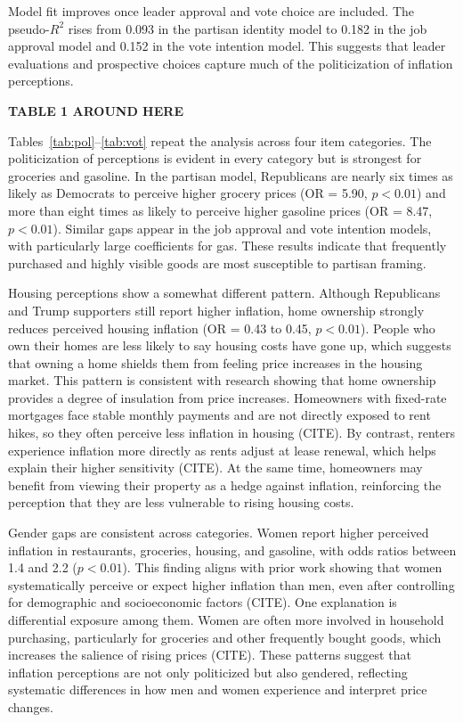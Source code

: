 \documentclass[preprint,12pt,authoryear]{elsarticle}
\begin{document}
Model fit improves once leader approval and vote choice are included. The pseudo-$R^2$ rises from 0.093 in the partisan identity model to 0.182 in the job approval model and 0.152 in the vote intention model. This suggests that leader evaluations and prospective choices capture much of the politicization of inflation perceptions.  



\begin{center}
\textbf{TABLE 1 AROUND HERE}
\end{center}

Tables~\ref{tab:pol}--\ref{tab:vot} repeat the analysis across four item categories. The politicization of perceptions is evident in every category but is strongest for groceries and gasoline. In the partisan model, Republicans are nearly six times as likely as Democrats to perceive higher grocery prices (OR = 5.90, $p<0.01$) and more than eight times as likely to perceive higher gasoline prices (OR = 8.47, $p<0.01$). Similar gaps appear in the job approval and vote intention models, with particularly large coefficients for gas. These results indicate that frequently purchased and highly visible goods are most susceptible to partisan framing.  

Housing perceptions show a somewhat different pattern. Although Republicans and Trump supporters still report higher inflation, home ownership strongly reduces perceived housing inflation (OR = 0.43 to 0.45, $p<0.01$). People who own their homes are less likely to say housing costs have gone up, which suggests that owning a home shields them from feeling price increases in the housing market. This pattern is consistent with research showing that home ownership provides a degree of insulation from price increases. Homeowners with fixed-rate mortgages face stable monthly payments and are not directly exposed to rent hikes, so they often perceive less inflation in housing (CITE). By contrast, renters experience inflation more directly as rents adjust at lease renewal, which helps explain their higher sensitivity (CITE). At the same time, homeowners may benefit from viewing their property as a hedge against inflation, reinforcing the perception that they are less vulnerable to rising housing costs.

Gender gaps are consistent across categories. Women report higher perceived inflation in restaurants, groceries, housing, and gasoline, with odds ratios between 1.4 and 2.2 ($p<0.01$). This finding aligns with prior work showing that women systematically perceive or expect higher inflation than men, even after controlling for demographic and socioeconomic factors (CITE). One explanation is differential exposure among them. Women are often more involved in household purchasing, particularly for groceries and other frequently bought goods, which increases the salience of rising prices (CITE). These patterns suggest that inflation perceptions are not only politicized but also gendered, reflecting systematic differences in how men and women experience and interpret price changes. 
\end{document}
